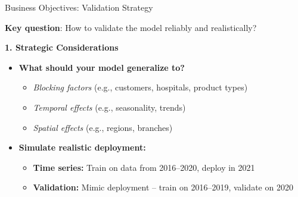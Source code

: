 \documentclass[10pt,compress,t,notes=noshow, xcolor=table]{beamer}
\begin{document}
\begin{frame}{Business Objectives: Validation Strategy}
\label{validation-strategy}

\textbf{Key question}: How to validate the model reliably and realistically?

\textbf{1. Strategic Considerations}
\begin{itemize}
  \item \textbf{What should your model generalize to?}
    \begin{itemize}
      \item \emph{Blocking factors} (e.g., customers, hospitals, product types)
      \item \emph{Temporal effects} (e.g., seasonality, trends)
      \item \emph{Spatial effects} (e.g., regions, branches)
    \end{itemize}

  \item \textbf{Simulate realistic deployment:}
    \begin{itemize}
      \item \textbf{Time series:} Train on data from 2016--2020, deploy in 2021
  \item \textbf{Validation:} Mimic deployment -- train on 2016--2019, validate on 2020
    \end{itemize}
\end{itemize}

\end{frame}
\end{document}
